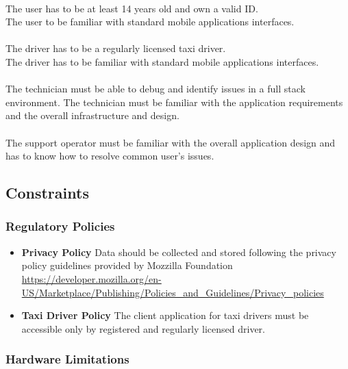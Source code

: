 \paragraph{} The user has to be at least 14 years old and own a valid ID.\\ 
The user to be familiar with standard mobile applications interfaces.
\paragraph{} The driver has to be a regularly licensed taxi driver.\\ The driver has to be familiar with standard mobile applications interfaces.
\paragraph{} 
The technician must be able to debug and identify issues in a full stack environment. The technician must be familiar with the application requirements and the overall infrastructure and design.
\paragraph{}  The support operator must be familiar with the overall application design and has to know how to resolve common user's issues.

\subsection{Constraints} 
\label{sub:constraints}

\subsubsection{Regulatory Policies} 
\label{ssub:regulatory_policies}
\begin{itemize}
	\item \textbf{Privacy Policy} Data should be collected and stored following the privacy policy guidelines provided by Mozzilla Foundation \url{https://developer.mozilla.org/en-US/Marketplace/Publishing/Policies_and_Guidelines/Privacy_policies}
	\item \textbf{Taxi Driver Policy} The client application for taxi drivers must be accessible only by registered and regularly licensed driver.
\end{itemize}

\subsubsection{Hardware Limitations} 
\label{ssub:hardware_limitations}
